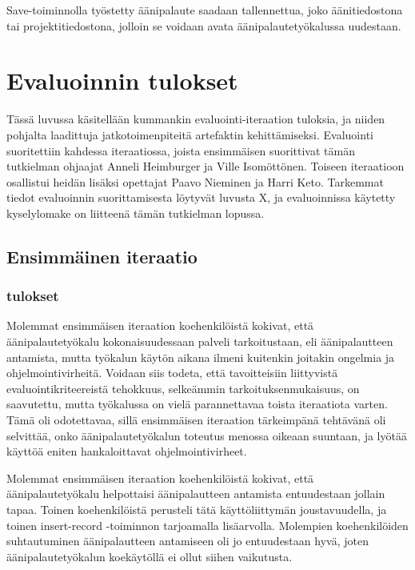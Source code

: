 \documentclass[utf8]{gradu3}
\begin{document}
Save-toiminnolla työstetty äänipalaute saadaan tallennettua, joko äänitiedostona tai projektitiedostona, jolloin se voidaan avata äänipalautetyökalussa uudestaan.

%

\chapter{Evaluoinnin tulokset}

Tässä luvussa käsitellään kummankin evaluointi-iteraation tuloksia, ja niiden pohjalta laadittuja jatkotoimenpiteitä artefaktin kehittämiseksi. Evaluointi suoritettiin kahdessa iteraatiossa, joista ensimmäisen suorittivat tämän tutkielman ohjaajat Anneli Heimburger ja Ville Isomöttönen. Toiseen iteraatioon osallistui heidän lisäksi opettajat Paavo Nieminen ja Harri Keto. Tarkemmat tiedot evaluoinnin suorittamisesta löytyvät luvusta X, ja evaluoinnissa käytetty kyselylomake on liitteenä tämän tutkielman lopussa.

\section{Ensimmäinen iteraatio}

\subsection{tulokset}

Molemmat ensimmäisen iteraation koehenkilöistä kokivat, että äänipalautetyökalu kokonaisuudessaan palveli tarkoitustaan, eli äänipalautteen antamista, mutta työkalun käytön aikana ilmeni kuitenkin joitakin ongelmia ja ohjelmointivirheitä. Voidaan siis todeta, että tavoitteisiin liittyvistä evaluointikriteereistä tehokkuus, selkeämmin tarkoituksenmukaisuus, on saavutettu, mutta työkalussa on vielä parannettavaa toista iteraatiota varten. Tämä oli odotettavaa, sillä ensimmäisen iteraation tärkeimpänä tehtävänä oli selvittää, onko äänipalautetyökalun toteutus menossa oikeaan suuntaan, ja lyötää käyttöä eniten hankaloittavat ohjelmointivirheet.

Molemmat ensimmäisen iteraation koehenkilöistä kokivat, että äänipalautetyökalu helpottaisi äänipalautteen antamista entuudestaan jollain tapaa. Toinen koehenkilöistä perusteli tätä käyttöliittymän joustavuudella, ja toinen insert-record -toiminnon tarjoamalla lisäarvolla. Molempien koehenkilöiden suhtautuminen äänipalautteen antamiseen oli jo entuudestaan hyvä, joten äänipalautetyökalun koekäytöllä ei ollut siihen vaikutusta.
\end{document}
